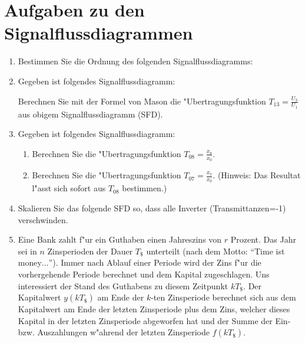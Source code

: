 \clearpage
\section{Aufgaben zu den Signalflussdiagrammen}
\begin{enumerate}
\item Bestimmen Sie die Ordnung des folgenden Signalflussdiagramms:
\begin{center}
\end{center}
\item Gegeben ist folgendes Signalflussdiagramm:
  \begin{center}
\end{center}
Berechnen Sie mit der Formel von Mason die "Ubertragungsfunktion
$T_{13}=\frac{U_3}{U_1}$ aus obigem Signalflussdiagramm (SFD).

\item Gegeben ist folgendes Signalflussdiagramm:
  \begin{center}
\end{center}
  \begin{enumerate}
  \item Berechnen Sie die "Ubertragungsfunktion $T_{08} =
    \frac{x_8}{x_0}$.
  \item Berechnen Sie die "Ubertragungsfunktion $T_{07} =
    \frac{x_7}{x_0}$. (Hinweis: Das Resultat l"asst sich
    sofort aus $T_{08}$ bestimmen.)
  \end{enumerate}
\item Skalieren Sie das folgende SFD so, dass alle
  Inverter (Transmittanzen=-1) verschwinden.
  \begin{center}
\end{center}
\item Eine Bank zahlt f"ur ein Guthaben einen Jahreszins von $r$
  Prozent.  Das Jahr sei in $n$ Zins\-perioden der Dauer \(T_{\$}\)
  unterteilt (nach dem Motto: ``Time ist money$\ldots$''). Immer nach
  Ablauf einer Periode wird der Zins f"ur die vorhergehende Periode
  berechnet und dem Kapital zugeschlagen. Uns interessiert der Stand
  des Guthabens zu diesem Zeitpunkt \(k T_{\$}\). Der Kapitalwert
  \(y(k T_{\$})\) am Ende der $k$-ten Zinsperiode berechnet sich aus
  dem Kapitalwert am Ende der letzten Zinsperiode plus dem Zins,
  welcher dieses Kapital in der letzten Zinsperiode abgeworfen hat und der
  Summe der Ein- bzw.  Auszahlungen w"ahrend der letzten Zinsperiode
  \(f(k T_{\$})\).


\end{enumerate}
